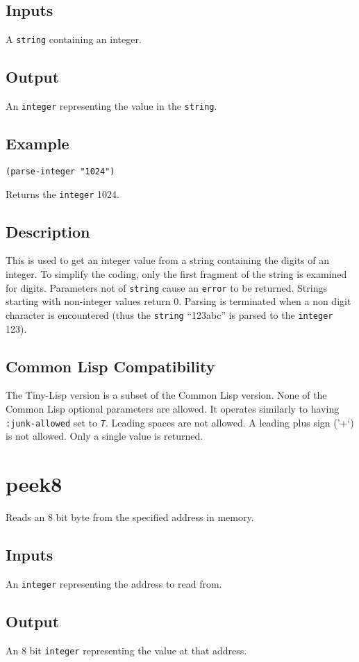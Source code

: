 \documentclass[10pt, openany]{book}
\newcommand{\constant}[1]{\emph{\texttt{#1}}}
\newcommand{\keyword}[1]{\texttt{#1}}
\newcommand{\datatype}[1]{\texttt{#1}}
\newcommand{\tl}{Tiny-Lisp}
\newcommand{\cl}{Common Lisp}
\begin{document}
\subsection{Inputs}
A \datatype{string} containing an integer.
\subsection{Output}
An \datatype{integer} representing the value in the \datatype{string}.
\subsection{Example}
\begin{lstlisting}
(parse-integer "1024")
\end{lstlisting}
Returns the \datatype{integer} 1024.
\subsection{Description}
This is used to get an integer value from a string containing the digits of an integer.  To simplify the coding, only the first fragment of the string is examined for digits.  Parameters not of \datatype{string} cause an \keyword{error} to be returned.  Strings starting with non-integer values return 0.  Parsing is terminated when a non digit character is encountered (thus the \datatype{string} ``123abc'' is parsed to the \datatype{integer} 123).
\subsection{Common Lisp Compatibility}
The \tl{} version is a subset of the \cl{} version.  None of the \cl{} optional parameters are allowed.  It operates similarly to having \keyword{:junk-allowed} set to \constant{T}. Leading spaces are not allowed.  A leading plus sign ('+`) is not allowed.  Only a single value is returned.

\section{peek8}
Reads an 8 bit byte from the specified address in memory.
\subsection{Inputs}
An \datatype{integer} representing the address to read from.
\subsection{Output}
An 8 bit \datatype{integer} representing the value at that address.
\end{document}

